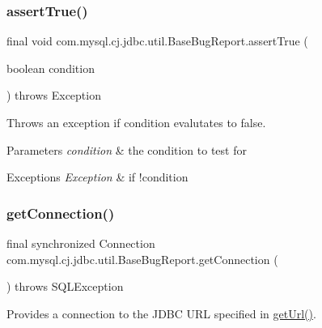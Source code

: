 \subsubsection{\texorpdfstring{assert\+True()}{assertTrue()}\hspace{0.1cm}{\footnotesize\ttfamily [2/2]}}
{\footnotesize\ttfamily final void com.\+mysql.\+cj.\+jdbc.\+util.\+Base\+Bug\+Report.\+assert\+True (\begin{DoxyParamCaption}\item[{boolean}]{condition }\end{DoxyParamCaption}) throws Exception\hspace{0.3cm}{\ttfamily [protected]}}

Throws an exception if condition evalutates to \textquotesingle{}false\textquotesingle{}.


\begin{DoxyParams}{Parameters}
{\em condition} & the condition to test for \\
\hline
\end{DoxyParams}

\begin{DoxyExceptions}{Exceptions}
{\em Exception} & if !condition \\
\hline
\end{DoxyExceptions}
\mbox{\label{classcom_1_1mysql_1_1cj_1_1jdbc_1_1util_1_1_base_bug_report_aef144ede71b00b26e1435e42314192c9}} 
\subsubsection{\texorpdfstring{get\+Connection()}{getConnection()}\hspace{0.1cm}{\footnotesize\ttfamily [1/3]}}
{\footnotesize\ttfamily final synchronized Connection com.\+mysql.\+cj.\+jdbc.\+util.\+Base\+Bug\+Report.\+get\+Connection (\begin{DoxyParamCaption}{ }\end{DoxyParamCaption}) throws S\+Q\+L\+Exception}

Provides a connection to the J\+D\+BC U\+RL specified in \mbox{\hyperlink{classcom_1_1mysql_1_1cj_1_1jdbc_1_1util_1_1_base_bug_report_af253a8d960912715ba0cc0fe1766c4d6}{get\+Url()}}.

